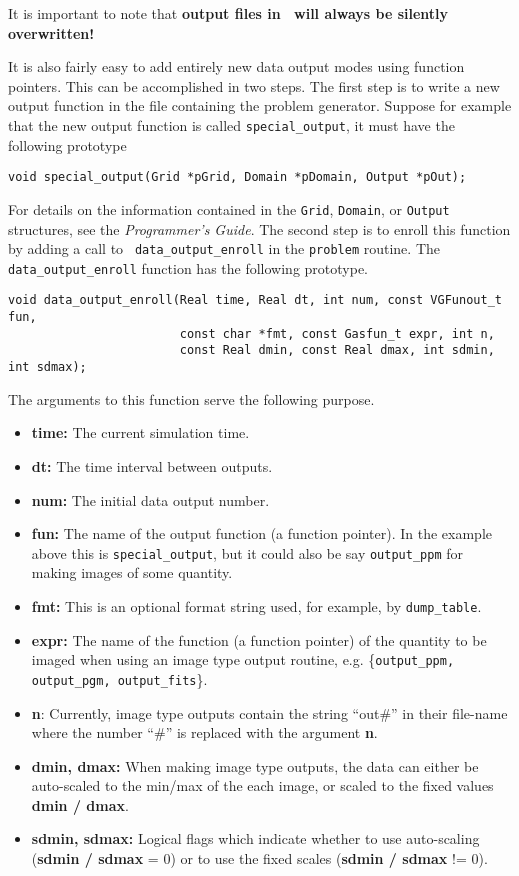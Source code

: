 It is important to note that {\bf output files in \ath\ will always be
silently overwritten!} 

It is also fairly easy to add entirely new data output modes using
function pointers. This can be accomplished in two steps.
The first step is to write a new output function in the file
containing the problem generator.  Suppose for example that the new
output function is called {\tt special\_output}, it must have the
following prototype

\footnotesize
\begin{verbatim}
void special_output(Grid *pGrid, Domain *pDomain, Output *pOut);
\end{verbatim}
\normalsize
\noindent
For details on the information contained in the {\tt Grid}, {\tt Domain},
or {\tt Output} structures, see the {\it Programmer's Guide}.  The second step
is to enroll this function by adding a call to {\tt
data\_output\_enroll} in the {\tt problem} routine.  The {\tt
data\_output\_enroll} function has the following prototype.

\footnotesize
\begin{verbatim}
void data_output_enroll(Real time, Real dt, int num, const VGFunout_t fun,
                        const char *fmt, const Gasfun_t expr, int n,
                        const Real dmin, const Real dmax, int sdmin, int sdmax);
\end{verbatim}
\normalsize

\noindent
The arguments to this function serve the following purpose.
\begin{itemize}
\item {\bf time:} The current simulation time.
\item {\bf dt:} The time interval between outputs.
\item {\bf num:} The initial data output number.
\item {\bf fun:} The name of the output function (a function pointer).  In
  the example above this is {\tt special\_output}, but it could also
  be say {\tt output\_ppm} for making images of some quantity.
\item {\bf fmt:} This is an optional format string used, for example,
  by {\tt dump\_table}.
\item {\bf expr:} The name of the function (a function pointer) of the
  quantity to be imaged when using an image type output routine,
  e.g. \{{\tt output\_ppm, output\_pgm, output\_fits}\}.
\item {\bf n}: Currently, image type outputs contain the string ``out\#'' 
in their file-name where the number ``\#'' is replaced with the argument 
{\bf n}.
\item {\bf dmin, dmax:} When making image type outputs, the data can 
either be auto-scaled to the min/max of the each image, or scaled to
the fixed values {\bf dmin / dmax}.
\item {\bf sdmin, sdmax:} Logical flags which indicate whether to use
auto-scaling ({\bf sdmin / sdmax} = 0) or to use the fixed scales
({\bf sdmin / sdmax} != 0).
\end{itemize}

